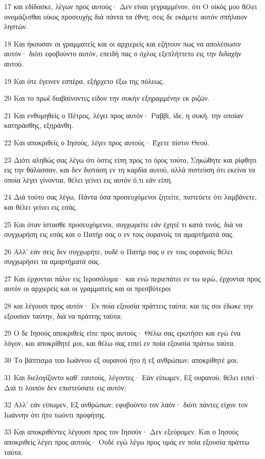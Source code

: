 \par 17 και εδίδασκε, λέγων προς αυτούς· Δεν είναι γεγραμμένον, ότι Ο οίκός μου θέλει ονομάζεσθαι οίκος προσευχής διά πάντα τα έθνη; σεις δε εκάμετε αυτόν σπήλαιον ληστών.
\par 18 Και ήκουσαν οι γραμματείς και οι αρχιερείς και εζήτουν πως να απολέσωσιν αυτόν· διότι εφοβούντο αυτόν, επειδή πας ο όχλος εξεπλήττετο εις την διδαχήν αυτού.
\par 19 Και ότε έγεινεν εσπέρα, εξήρχετο έξω της πόλεως.
\par 20 Και το πρωΐ διαβαίνοντες είδον την συκήν εξηραμμένην εκ ριζών.
\par 21 Και ενθυμηθείς ο Πέτρος, λέγει προς αυτόν· Ραββί, ίδε, η συκή, την οποίαν κατηράσθης, εξηράνθη.
\par 22 Και αποκριθείς ο Ιησούς, λέγει προς αυτούς· Έχετε πίστιν Θεού.
\par 23 Διότι αληθώς σας λέγω ότι όστις είπη προς το όρος τούτο, Σηκώθητε και ρίφθητι εις την θάλασσαν, και δεν διστάση εν τη καρδία αυτού, αλλά πιστεύση ότι εκείνα τα οποία λέγει γίνονται, θέλει γείνει εις αυτόν ό,τι εάν είπη.
\par 24 Διά τούτο σας λέγω, Πάντα όσα προσευχόμενοι ζητείτε, πιστεύετε ότι λαμβάνετε, και θέλει γείνει εις εσάς.
\par 25 Και όταν ίστασθε προσευχόμενοι, συγχωρείτε εάν έχητέ τι κατά τινός, διά να συγχωρήση εις εσάς και ο Πατήρ σας ο εν τοις ουρανοίς τα αμαρτήματά σας.
\par 26 Αλλ' εάν σεις δεν συγχωρήτε, ουδέ ο Πατήρ σας ο εν τοις ουρανοίς θέλει συγχωρήσει τα αμαρτήματά σας.
\par 27 Και έρχονται πάλιν εις Ιεροσόλυμα· και ενώ περιεπάτει εν τω ιερώ, έρχονται προς αυτόν οι αρχιερείς και οι γραμματείς και οι πρεσβύτεροι
\par 28 και λέγουσι προς αυτόν· Εν ποία εξουσία πράττεις ταύτα; και τις σοι έδωκε την εξουσίαν ταύτην, διά να πράττης ταύτα;
\par 29 Ο δε Ιησούς αποκριθείς είπε προς αυτούς· Θέλω σας ερωτήσει και εγώ ένα λόγον, και αποκρίθητέ μοι, και θέλω σας ειπεί εν ποία εξουσία πράττω ταύτα.
\par 30 Το βάπτισμα του Ιωάννου εξ ουρανού ήτο ή εξ ανθρώπων; αποκρίθητέ μοι.
\par 31 Και διελογίζοντο καθ' εαυτούς, λέγοντες· Εάν είπωμεν, Εξ ουρανού, θέλει ειπεί· Διά τι λοιπόν δεν επιστεύσατε εις αυτόν;
\par 32 Αλλ' εάν είπωμεν, Εξ ανθρώπων; εφοβούντο τον λαόν· διότι πάντες είχον τον Ιωάννην ότι ήτο τωόντι προφήτης.
\par 33 Και αποκριθέντες λέγουσι προς τον Ιησούν· Δεν εξεύρομεν. Και ο Ιησούς αποκριθείς λέγει προς αυτούς· Ουδέ εγώ λέγω προς υμάς εν ποία εξουσία πράττω ταύτα.

